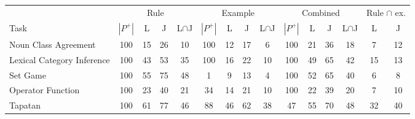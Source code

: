 \begin{tabular}{@{}lcccccccccccccc@{}}
\toprule
 & \multicolumn{4}{c}{Rule} & \multicolumn{4}{c}{Example} & \multicolumn{4}{c}{Combined} & \multicolumn{2}{c}{Rule $\cap$ ex.} \\
\cmidrule(lr){2-5}\cmidrule(lr){6-9}\cmidrule(lr){10-13}\cmidrule(lr){14-15}
Task & $|P^+|$ & L & J & L$\cap$J & $|P^+|$ & L & J & L$\cap$J & $|P^+|$ & L & J & L$\cap$J & L & J \\
\midrule
Noun Class Agreement & 100 & 15 & 26 & 10 & 100 & 12 & 17 & 6 & 100 & 21 & 36 & 18 & 7 & 12 \\
Lexical Category Inference & 100 & 43 & 53 & 35 & 100 & 16 & 22 & 10 & 100 & 49 & 65 & 42 & 15 & 13 \\
Set Game & 100 & 55 & 75 & 48 & 1 & 9 & 13 & 4 & 100 & 52 & 65 & 40 & 6 & 8 \\
Operator Function & 100 & 23 & 40 & 21 & 34 & 14 & 21 & 10 & 100 & 22 & 39 & 20 & 7 & 10 \\
Tapatan & 100 & 61 & 77 & 46 & 88 & 46 & 62 & 38 & 47 & 55 & 70 & 48 & 32 & 40 \\
\bottomrule
\end{tabular}
